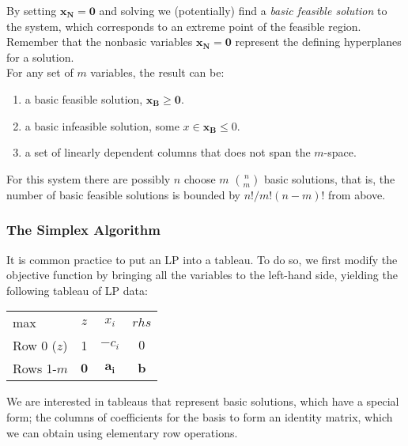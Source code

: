 By setting $\mathbf{x_N} = \mathbf{0}$ and solving we (potentially) find a {\it basic feasible solution} to the system, which corresponds to an extreme point of the feasible region. Remember that the nonbasic variables $\mathbf{x_N} = \mathbf{0}$ represent the defining hyperplanes for a solution. \\

For any set of $m$ variables, the result can be:

\begin{enumerate}
\item a basic feasible solution, $\mathbf{x_B} \ge \mathbf{0}$.
\item a basic infeasible solution, some $x \in \mathbf{x_B} \le 0$.
\item a set of linearly dependent columns that does not span the $m$-space.
\end{enumerate}

For this system there are possibly $n$ choose $m$ ${n \choose m}$ basic solutions, that is, the number of basic feasible solutions is bounded by $n!/m!(n-m)!$ from above.  \\

\subsubsection{The Simplex Algorithm}

It is common practice to put an LP into a tableau.  To do so, we first modify the objective function by bringing all the variables to the left-hand side, yielding the following tableau of LP data: 
\begin{center} \begin{tabular} {l|c|c|c|} \cline{2-4}
max                    					& $z$	        		  & $x_i$	               &  $rhs$  \\ \cline{2-4}
Row 0 ($z$)         		& 1	            		  & $-c_i$ 			  & $0$	    \\ \cline{2-4}
Rows 1-$m$                & $\mathbf{0}$ & $\mathbf{a_i}$ & $\mathbf{b}$  \\ \cline{2-4}
\end{tabular} \end{center}

We are interested in tableaus that represent basic solutions, which have a special form; the columns of coefficients for the basis to form an identity matrix, which we can obtain using elementary row operations. \\


